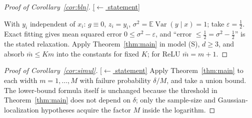 \documentclass[11pt,reqno]{amsart}
\theoremstyle{plain}
\theoremstyle{definition}
\theoremstyle{remark}
\newcommand{\EE}{\mathbb{E}}
\newcommand{\eps}{\varepsilon}
\DeclareMathOperator{\Var}{Var}
\newcommand{\stmtbutton}[1]{\hyperref[#1]{\textnormal{\footnotesize\textsf{[$\leftarrow$ statement]}}}}
\begin{document}
\begin{proof}[Proof of Corollary~\textup{\ref{cor:bln}}]\label{proof:bln}\stmtbutton{cor:bln}

With $y_i$ independent of $x_i$: $g\equiv0$, $z_i=y_i$, $\sigma^2=\EE\Var(y\mid x)=1$; take $\eps=\tfrac12$. Exact fitting gives mean squared error $0\le\sigma^2-\eps$, and ``error $\le\tfrac12=\sigma^2-\tfrac12$'' is the stated relaxation. Apply Theorem~\ref{thm:main} in model (S), $d\ge3$, and absorb $\bar m\le Km$ into the constants for fixed $K$; for ReLU $\bar m=m+1$.
\end{proof}

\begin{proof}[Proof of Corollary~\textup{\ref{cor:simul}}]\label{proof:simul}\stmtbutton{cor:simul}
Apply Theorem~\ref{thm:main} to each width $m=1,\dots,M$ with failure probability $\delta/M$, and take a union bound. The lower-bound formula itself is unchanged because the threshold in Theorem~\ref{thm:main} does not depend on $\delta$; only the sample-size and Gaussian-localization hypotheses acquire the factor $M$ inside the logarithm.
\end{proof}
\end{document}
